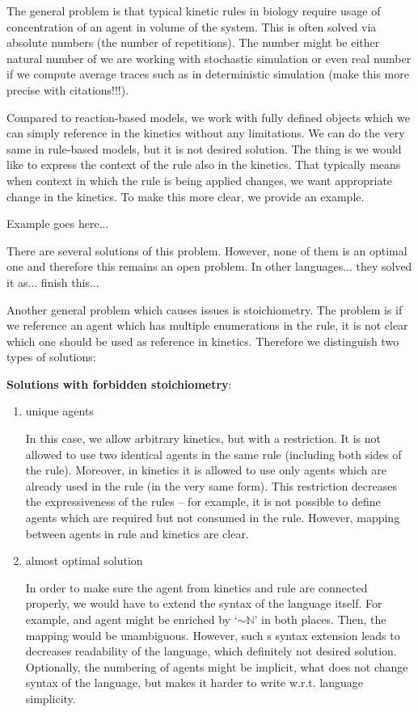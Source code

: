\documentclass[12pt]{fithesis2}
\begin{document}
The general problem is that typical kinetic rules in biology require usage of concentration of an agent in volume of the system. This is often solved via absolute numbers (the number of repetitions). The number might be either natural number of we are working with stochastic simulation or even real number if we compute average traces such as in deterministic simulation (make this more precise with citations!!!).

Compared to reaction-based models, we work with fully defined objects which we can simply reference in the kinetics without any limitations. We can do the very same in rule-based models, but it is not desired solution. The thing is we would like to express the context of the rule also in the kinetics. That typically means when context in which the rule is being applied changes, we want appropriate change in the kinetics. To make this more clear, we provide an example.

Example goes here...

There are several solutions of this problem. However, none of them is an optimal one and therefore this remains an open problem. In other languages... they solved it as... finish this...

Another general problem which causes issues is stoichiometry. The problem is if we reference an agent which has multiple enumerations in the rule, it is not clear which one should be used as reference in kinetics. Therefore we distinguish two types of solutions:

\textbf{Solutions with forbidden stoichiometry}:

\begin{enumerate}
\item unique agents

In this case, we allow arbitrary kinetics, but with a restriction. It is not allowed to use two identical agents in the same rule (including both sides of the rule). Moreover, in kinetics it is allowed to use only agents which are already used in the rule (in the very same form). This restriction decreases the expressiveness of the rules -- for example, it is not possible to define agents which are required but not consumed in the rule. However, mapping between agents in rule and kinetics are clear.

\item almost optimal solution

In order to make sure the agent from kinetics and rule are connected properly, we would have to extend the syntax of the language itself. For example, and agent might be enriched by `$\sim\mathbb{N}$' in both places. Then, the mapping would be unambiguous. However, such s syntax extension leads to decreases readability of the language, which definitely not desired solution. Optionally, the numbering of agents might be implicit, what does not change syntax of the language, but makes it harder to write w.r.t. language simplicity.

\end{enumerate}
\end{document}
